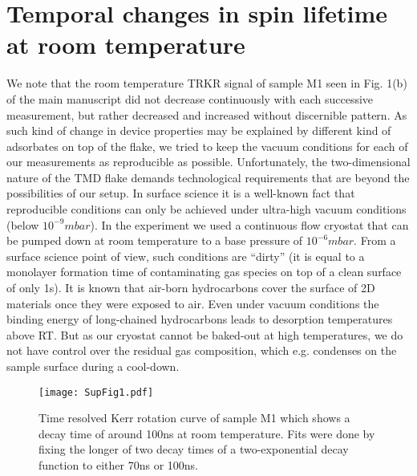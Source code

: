 \documentclass[prb,aps,superscriptaddress,reprint,floatfix]{revtex4-1}
\begin{document}
\section{Temporal changes in spin lifetime at room temperature}
We note that the room temperature TRKR signal of sample M1 seen in Fig. 1(b) of the main manuscript did not decrease continuously with each successive measurement, but rather decreased and increased without discernible pattern. As such kind of change in device properties may be explained by different kind of adsorbates on top of the flake, we tried to keep the vacuum conditions for each of our measurements as reproducible as possible. Unfortunately, the two-dimensional nature of the TMD flake demands technological requirements that are beyond the possibilities of our setup. In surface science it is a well-known fact that reproducible conditions can only be achieved under ultra-high vacuum conditions (below $\unit{10^{-9}}{mbar}$). In the experiment we used a continuous flow cryostat that can be pumped down at room temperature to a base pressure of  $\unit{10^{-6}}{mbar}$. From a surface science point of view, such conditions are “dirty” (it is equal to a monolayer formation time of contaminating gas species on top of a clean surface of only \unit{1}{s}). It is known that air-born hydrocarbons cover the surface of 2D materials once they were exposed to air.\cite{Carbon.61.33, Langmuir.31.8429} Even under vacuum conditions the binding energy of long-chained hydrocarbons leads to desorption temperatures above RT.\cite{Carbon.44.2931, Carbon.61.33} But as our cryostat cannot be baked-out at high temperatures, we do not have control over the residual gas composition, which e.g. condenses on the sample surface during a cool-down.

\begin{figure}[tb]
	\texttt{[image: SupFig1.pdf]}
\caption{Time resolved Kerr rotation curve of sample M1 which shows a decay time of around \unit{100}{ns} at room temperature. Fits were done by fixing the longer of two decay times of a two-exponential decay function to either \unit{70}{ns} or \unit{100}{ns}.}
\label{SupFig1}
\end{figure}
\end{document}
